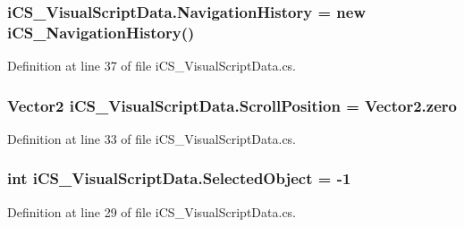 \hypertarget{classi_c_s___visual_script_data_aeca6827cf83bcb04b2ae5761fb4ad9b9}{
\subsubsection[{Navigation\+History}]{ i\+C\+S\+\_\+\+Visual\+Script\+Data.\+Navigation\+History = new {\bf i\+C\+S\+\_\+\+Navigation\+History}()}}\label{classi_c_s___visual_script_data_aeca6827cf83bcb04b2ae5761fb4ad9b9}


Definition at line 37 of file i\+C\+S\+\_\+\+Visual\+Script\+Data.\+cs.

\hypertarget{classi_c_s___visual_script_data_ae9ef65cbefa1d2a799808fde0fc89b5b}{
\subsubsection[{Scroll\+Position}]{\setlength{\rightskip}{0pt plus 5cm}Vector2 i\+C\+S\+\_\+\+Visual\+Script\+Data.\+Scroll\+Position = Vector2.\+zero}}\label{classi_c_s___visual_script_data_ae9ef65cbefa1d2a799808fde0fc89b5b}


Definition at line 33 of file i\+C\+S\+\_\+\+Visual\+Script\+Data.\+cs.

\hypertarget{classi_c_s___visual_script_data_ad3d3683654dbc05409deed3cc02d5d37}{
\subsubsection[{Selected\+Object}]{\setlength{\rightskip}{0pt plus 5cm}int i\+C\+S\+\_\+\+Visual\+Script\+Data.\+Selected\+Object = -\/1}}\label{classi_c_s___visual_script_data_ad3d3683654dbc05409deed3cc02d5d37}


Definition at line 29 of file i\+C\+S\+\_\+\+Visual\+Script\+Data.\+cs.


